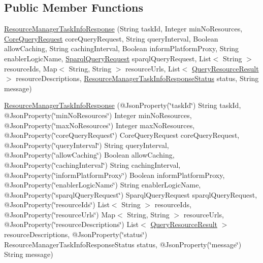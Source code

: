 \subsection*{Public Member Functions}
\begin{DoxyCompactItemize}
\item 
\hyperlink{classeu_1_1h2020_1_1symbiote_1_1enabler_1_1messaging_1_1model_1_1ResourceManagerTaskInfoResponse_aad00eba68574ad7259b652c975c5cd82}{Resource\+Manager\+Task\+Info\+Response} (String task\+Id, Integer min\+No\+Resources, \hyperlink{classeu_1_1h2020_1_1symbiote_1_1core_1_1internal_1_1CoreQueryRequest}{Core\+Query\+Request} core\+Query\+Request, String query\+Interval, Boolean allow\+Caching, String caching\+Interval, Boolean inform\+Platform\+Proxy, String enabler\+Logic\+Name, \hyperlink{classeu_1_1h2020_1_1symbiote_1_1core_1_1ci_1_1SparqlQueryRequest}{Sparql\+Query\+Request} sparql\+Query\+Request, List$<$ String $>$ resource\+Ids, Map$<$ String, String $>$ resource\+Urls, List$<$ \hyperlink{classeu_1_1h2020_1_1symbiote_1_1core_1_1ci_1_1QueryResourceResult}{Query\+Resource\+Result} $>$ resource\+Descriptions, \hyperlink{enumeu_1_1h2020_1_1symbiote_1_1enabler_1_1messaging_1_1model_1_1ResourceManagerTaskInfoResponseStatus}{Resource\+Manager\+Task\+Info\+Response\+Status} status, String message)
\item 
\hyperlink{classeu_1_1h2020_1_1symbiote_1_1enabler_1_1messaging_1_1model_1_1ResourceManagerTaskInfoResponse_acbef8a04c3b7861e7052170f6f0db1b9}{Resource\+Manager\+Task\+Info\+Response} (@Json\+Property(\char`\"{}task\+Id\char`\"{}) String task\+Id, @Json\+Property(\char`\"{}min\+No\+Resources\char`\"{}) Integer min\+No\+Resources, @Json\+Property(\char`\"{}max\+No\+Resources\char`\"{}) Integer max\+No\+Resources, @Json\+Property(\char`\"{}core\+Query\+Request\char`\"{}) Core\+Query\+Request core\+Query\+Request, @Json\+Property(\char`\"{}query\+Interval\char`\"{}) String query\+Interval, @Json\+Property(\char`\"{}allow\+Caching\char`\"{}) Boolean allow\+Caching, @Json\+Property(\char`\"{}caching\+Interval\char`\"{}) String caching\+Interval, @Json\+Property(\char`\"{}inform\+Platform\+Proxy\char`\"{}) Boolean inform\+Platform\+Proxy, @Json\+Property(\char`\"{}enabler\+Logic\+Name\char`\"{}) String enabler\+Logic\+Name, @Json\+Property(\char`\"{}sparql\+Query\+Request\char`\"{}) Sparql\+Query\+Request sparql\+Query\+Request, @Json\+Property(\char`\"{}resource\+Ids\char`\"{}) List$<$ String $>$ resource\+Ids, @Json\+Property(\char`\"{}resource\+Urls\char`\"{}) Map$<$ String, String $>$ resource\+Urls, @Json\+Property(\char`\"{}resource\+Descriptions\char`\"{}) List$<$ \hyperlink{classeu_1_1h2020_1_1symbiote_1_1core_1_1ci_1_1QueryResourceResult}{Query\+Resource\+Result} $>$ resource\+Descriptions, @Json\+Property(\char`\"{}status\char`\"{}) Resource\+Manager\+Task\+Info\+Response\+Status status, @Json\+Property(\char`\"{}message\char`\"{}) String message)

\end{DoxyCompactItemize}
